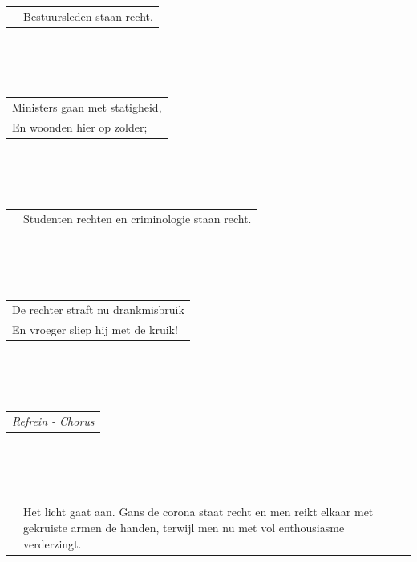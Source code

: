 \documentclass{article}
\begin{document}
\\\\\\
\begin{tabularx}{\textwidth} {
   c >{\raggedright\arraybackslash}X}
    \hspace{5mm} & {\small Bestuursleden staan recht.}\\
\end{tabularx}
\\\\\\
\begin{tabularx}{0.7\textwidth} {
   >{\raggedright\arraybackslash}X }
Ministers gaan met statigheid, \\
En woonden hier op zolder; \\
\end{tabularx}
\\\\\\
\begin{tabularx}{\textwidth} {
   c >{\raggedright\arraybackslash}X}
    \hspace{5mm} & {\small Studenten rechten en criminologie staan recht.}\\
\end{tabularx}
\\\\\\
\begin{tabularx}{0.7\textwidth} {
   >{\raggedright\arraybackslash}X }
De rechter straft nu drankmisbruik \\
En vroeger sliep hij met de kruik! \\
\end{tabularx}
\\\\\\
\begin{tabularx}{0.7\textwidth} {
   >{\raggedright\arraybackslash}X }
   \textit{Refrein - Chorus}\\
\end{tabularx}
\\\\\\
\begin{tabularx}{\textwidth} {
   c >{\raggedright\arraybackslash}X}
    \hspace{5mm} & {\small Het licht gaat aan. Gans de corona staat recht en men reikt elkaar
met gekruiste armen de handen, terwijl men nu met vol enthousiasme
verderzingt.}\\
\end{tabularx}
\end{document}
